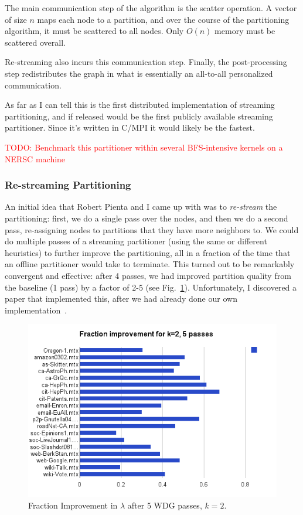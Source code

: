\documentclass[11pt]{article}
\newcommand\warning[1]{\textcolor{red}{#1}}
\begin{document}
The main communication step of the algorithm is the scatter operation. A vector of size $n$ maps each node to a partition, and over the course of the partitioning algorithm, it must be scattered to all nodes. Only $O(n)$ memory must be scattered overall.

Re-streaming also incurs this communication step. Finally, the post-processing step redistributes the graph in what is essentially an all-to-all personalized communication. 

As far as I can tell this is the first distributed implementation of streaming partitioning, and if released would be the first publicly available streaming partitioner. Since it's written in C/MPI it would likely be the fastest. 

\warning{TODO: Benchmark this partitioner within several BFS-intensive kernels on a NERSC machine}

\subsubsection{Re-streaming Partitioning}
An initial idea that Robert Pienta and I came up with was to \textit{re-stream} the partitioning: first, we do a single pass over the nodes, and then we do a second pass, re-assigning nodes to partitions that they have more neighbors to. We could do multiple passes of a streaming partitioner (using the same or different heuristics) to further improve the partitioning, all in a fraction of the time that an offline partitioner would take to terminate.  This turned out to be remarkably convergent and effective: after 4 passes, we had improved partition quality from the baseline (1 pass) by a factor of 2-5 (see Fig.~\ref{fig:03}). Unfortunately, I discovered a paper that implemented this, after we had already done our own implementation~\cite{Nishiura13}.

\begin{figure}[h!]
\centering
\includegraphics[scale=0.70] {figures/litreview/2partfrac}
\caption[Caption for]{Fraction Improvement in $\lambda$ after 5 WDG passes, $k=2$.}
\label{fig:03}
\end{figure}
\end{document}
